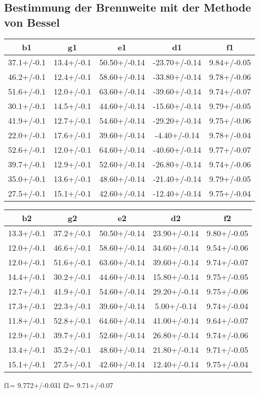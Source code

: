 \subsection{Bestimmung der Brennweite mit der Methode von Bessel}
\begin{table}
  \centering
\begin{tabular}{ccccc}
  \toprule
b1 & g1 & e1 & d1 & f1 \\
\midrule
37.1+/-0.1 & 13.4+/-0.1 & 50.50+/-0.14 & -23.70+/-0.14 & 9.84+/-0.05 \\
46.2+/-0.1 & 12.4+/-0.1 & 58.60+/-0.14 & -33.80+/-0.14 & 9.78+/-0.06 \\
51.6+/-0.1 & 12.0+/-0.1 & 63.60+/-0.14 & -39.60+/-0.14 & 9.74+/-0.07 \\
30.1+/-0.1 & 14.5+/-0.1 & 44.60+/-0.14 & -15.60+/-0.14 & 9.79+/-0.05 \\
41.9+/-0.1 & 12.7+/-0.1 & 54.60+/-0.14 & -29.20+/-0.14 & 9.75+/-0.06 \\
22.0+/-0.1 & 17.6+/-0.1 & 39.60+/-0.14 & -4.40+/-0.14 & 9.78+/-0.04 \\
52.6+/-0.1 & 12.0+/-0.1 & 64.60+/-0.14 & -40.60+/-0.14 & 9.77+/-0.07 \\
39.7+/-0.1 & 12.9+/-0.1 & 52.60+/-0.14 & -26.80+/-0.14 & 9.74+/-0.06 \\
35.0+/-0.1 & 13.6+/-0.1 & 48.60+/-0.14 & -21.40+/-0.14 & 9.79+/-0.05 \\
27.5+/-0.1 & 15.1+/-0.1 & 42.60+/-0.14 & -12.40+/-0.14 & 9.75+/-0.04 \\
\bottomrule
\end{tabular}
\end{table}
\begin{table}
  \centering
\begin{tabular}{ccccc}
  \toprule
b2 & g2 & e2 & d2 & f2 \\
\midrule
13.3+/-0.1 & 37.2+/-0.1 & 50.50+/-0.14 & 23.90+/-0.14 & 9.80+/-0.05 \\
12.0+/-0.1 & 46.6+/-0.1 & 58.60+/-0.14 & 34.60+/-0.14 & 9.54+/-0.06 \\
12.0+/-0.1 & 51.6+/-0.1 & 63.60+/-0.14 & 39.60+/-0.14 & 9.74+/-0.07 \\
14.4+/-0.1 & 30.2+/-0.1 & 44.60+/-0.14 & 15.80+/-0.14 & 9.75+/-0.05 \\
12.7+/-0.1 & 41.9+/-0.1 & 54.60+/-0.14 & 29.20+/-0.14 & 9.75+/-0.06 \\
17.3+/-0.1 & 22.3+/-0.1 & 39.60+/-0.14 & 5.00+/-0.14 & 9.74+/-0.04 \\
11.8+/-0.1 & 52.8+/-0.1 & 64.60+/-0.14 & 41.00+/-0.14 & 9.64+/-0.07 \\
12.9+/-0.1 & 39.7+/-0.1 & 52.60+/-0.14 & 26.80+/-0.14 & 9.74+/-0.06 \\
13.4+/-0.1 & 35.2+/-0.1 & 48.60+/-0.14 & 21.80+/-0.14 & 9.71+/-0.05 \\
15.1+/-0.1 & 27.5+/-0.1 & 42.60+/-0.14 & 12.40+/-0.14 & 9.75+/-0.04 \\
\bottomrule
\end{tabular}
\end{table}
f1= 9.772+/-0.031
f2= 9.71+/-0.07
